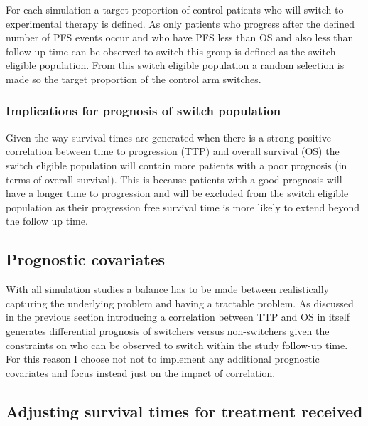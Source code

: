 For each simulation a target proportion of control patients who will switch to experimental therapy is defined. As only patients who progress after the defined number of PFS events occur and who have PFS less than OS and also less than follow-up time can be observed to switch this group is defined as the switch eligible population. From this switch eligible population a random selection is made so the target proportion of the control arm switches.

\subsubsection{Implications for prognosis of switch population}
Given the way survival times are generated when there is a strong positive correlation between time to progression (TTP) and overall survival (OS) the switch eligible population will contain more patients with a poor prognosis (in terms of overall survival). This is because patients with a good prognosis will have a longer time to progression and will be excluded from the switch eligible population as their progression free survival time is more likely to  extend beyond the follow up time.

\subsection{Prognostic covariates}

With all simulation studies a balance has to be made between realistically capturing the underlying problem and having a tractable problem. As discussed in the previous section introducing a correlation between TTP and OS in itself generates differential prognosis of switchers versus non-switchers given the constraints on who can be observed to switch within the study follow-up time. For this reason I choose not not to implement any additional prognostic covariates and focus instead just on the impact of correlation. 

\clearpage

\subsection{Adjusting survival times for treatment received}
\label{S:chap_sim_design:trtEffects}

